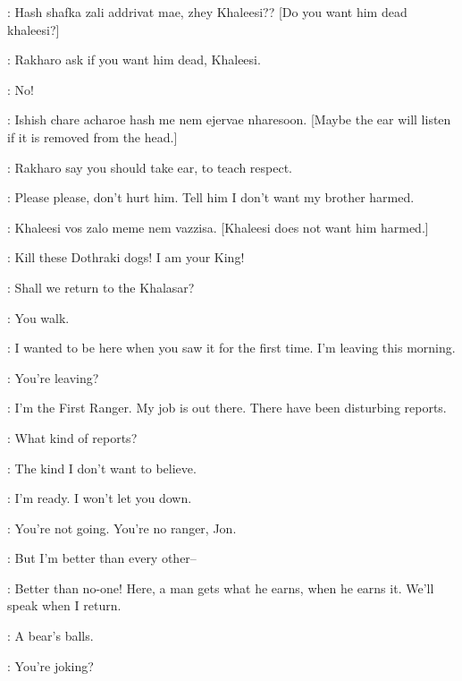 \RAKHARO: Hash shafka zali addrivat mae, zhey Khaleesi?? [Do you want him dead khaleesi?]

\IRRI: Rakharo ask if you want him dead, Khaleesi. 

\DAENERYS: No! 

\RAKHARO: Ishish chare acharoe hash me nem ejervae nharesoon. [Maybe the ear will listen if it is removed from the head.]

\IRRI: Rakharo say you should take ear, to teach respect. 

\DAENERYS: Please please, don't hurt him. Tell him I don't want my brother harmed. 

\IRRI: Khaleesi vos zalo meme nem vazzisa. [Khaleesi does not want him harmed.]


\VISERYS:  Kill these Dothraki dogs! I am your King! 

\JORAH:  Shall we return to the Khalasar? 

\RAKHARO:  You walk. 

\scene



\BENJEN: I wanted to be here when you saw it for the first time. I'm leaving this morning. 

\JON: You're leaving? 

\BENJEN: I'm the First Ranger. My job is out there. There have been disturbing reports. 

\JON: What kind of reports? 

\BENJEN: The kind I don't want to believe. 

\JON: I'm ready. I won't let you down. 

\BENJEN: You're not going. You're no ranger, Jon. 

\JON: But I'm better than every other-- 

\BENJEN: Better than no-one! Here, a man gets what he earns, when he earns it. We'll speak when I return. 


\scene


\YOREN: A bear's balls. 

\TYRION: You're joking? 

